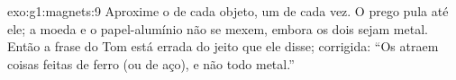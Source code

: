 \begin{solution}{exo:g1:magnets:9}
Aproxime o  de cada objeto, um de cada vez. O prego pula até ele;
a moeda e o papel-alumínio não se mexem, embora os dois sejam metal.
Então a frase do Tom está errada do jeito que ele disse; corrigida:
``Os  atraem coisas feitas de ferro (ou de aço), e não todo
metal.''
\end{solution}
